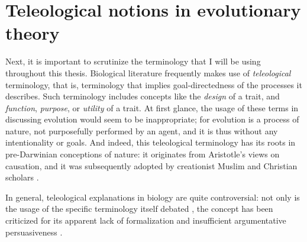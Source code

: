 \section{Teleological notions in evolutionary theory}
\label{sec:teleology}
Next, it is important to scrutinize the terminology that I will be using throughout this thesis.
Biological literature frequently makes use of \emph{teleological} terminology, that is, terminology that implies goal-directedness of the processes it describes. Such terminology includes concepts like the \emph{design} of a trait, and \emph{function}, \emph{purpose}, or \emph{utility} of a trait.
At first glance, the usage of these terms in discussing evolution would seem to be inappropriate; for evolution is a process of nature, not purposefully performed by an agent, and it is thus without any intentionality or goals.
And indeed, this teleological terminology has its roots in pre-Darwinian conceptions of nature: it originates from Aristotle's views on causation, and it was subsequently adopted by creationist Muslim and Christian scholars \citep{Johnson05}.

In general, teleological explanations in biology are quite controversial: not only is the usage of the specific terminology itself debated \citep[p.~27 and references therein]{Ayala99}, the concept has been criticized for its apparent lack of formalization and insufficient argumentative persuasiveness \citep[p.~83]{Baedke2021}.

